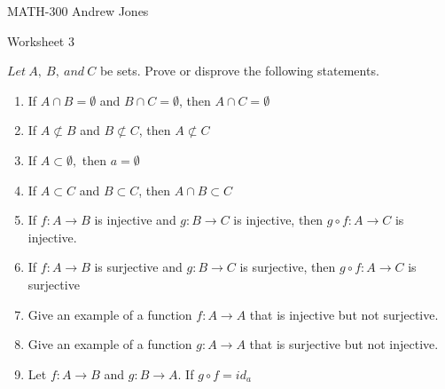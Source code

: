 \documentclass{article}
\begin{document}
  MATH-300 \hfill Andrew Jones
  \newline
  \begin{center}
  {\huge Worksheet 3}
  \end{center}
  $Let\ A,\ B,\ and\ C$ be sets. Prove or disprove the following statements. \\
  \begin{enumerate}
  \item If $A\cap B = \emptyset$ and $B\cap C = \emptyset$, then $A\cap C = \emptyset$ 
  \item If $A\not\subset B$ and $B\not\subset C$, then $A\not\subset C$ 
  \item If $A\subset \emptyset,$ then $a= \emptyset$ 
  \item If $A\subset C$ and $B\subset C$, then $A\cap B\subset C$
  \item If $f : A\to B$ is injective and $g : B\to C$ is injective, then $g \circ f : A\to C$ is injective. 
  \item If $f : A\to B$ is surjective and $g : B\to C$ is surjective, then $g \circ f : A\to C$ is surjective 
  \item Give an example of a function $f : A\to A$ that is injective but not surjective. 
  \item Give an example of a function $g : A\to A$ that is surjective but not injective. 
  \item Let $f : A\to B$ and $g : B\to A$. If $g \circ f = id_{a}$ 
  \end{enumerate}
\end{document}
